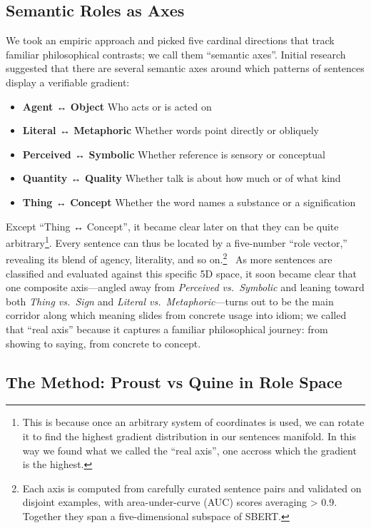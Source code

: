 \documentclass[12pt]{article}
\providecommand{\tightlist}{}   %
\begin{document}
\subsection{Semantic Roles as Axes}\label{semantic-roles-as-axes}

We took an empiric approach and picked five cardinal directions that track familiar philosophical contrasts; we call them ``semantic axes''. Initial research suggested that there are several semantic axes around which patterns of sentences display a verifiable gradient:

\begin{itemize}
\tightlist
\item
  \textbf{Agent ↔ Object} Who acts or is acted on
\item
  \textbf{Literal ↔ Metaphoric} Whether words point directly or obliquely
\item
  \textbf{Perceived ↔ Symbolic} Whether reference is sensory or conceptual
\item
  \textbf{Quantity ↔ Quality} Whether talk is about how much or of what kind
\item
  \textbf{Thing ↔ Concept} Whether the word names a substance or a signification
\end{itemize}

Except ``Thing ↔ Concept'', it became clear later on that they can be quite arbitrary\footnote{This is because once an arbitrary system of coordinates is used, we can rotate it to find the highest gradient distribution in our sentences manifold. In this way we found what we called the ``real axis'', one accross which the gradient is the highest.}. Every sentence can thus be located by a five-number ``role vector,'' revealing its blend of agency, literality, and so on.\footnote{Each axis is computed from carefully curated sentence pairs and validated on disjoint examples, with area-under-curve (AUC) scores averaging \textgreater{} 0.9.~ Together they span a five-dimensional subspace of SBERT.}~ As more sentences are classified and evaluated against this specific 5D space, it soon became clear that one composite axis---angled away from \emph{Perceived vs.~Symbolic} and leaning toward both \emph{Thing vs.~Sign} and \emph{Literal vs.~Metaphoric}---turns out to be the main corridor along which meaning slides from concrete usage into idiom; we called that ``real axis'' because it captures a familiar philosophical journey: from showing to saying, from concrete to concept.

\subsection{The Method: Proust vs Quine in Role Space}\label{the-method-proust-vs-quine-in-role-space}
\end{document}
